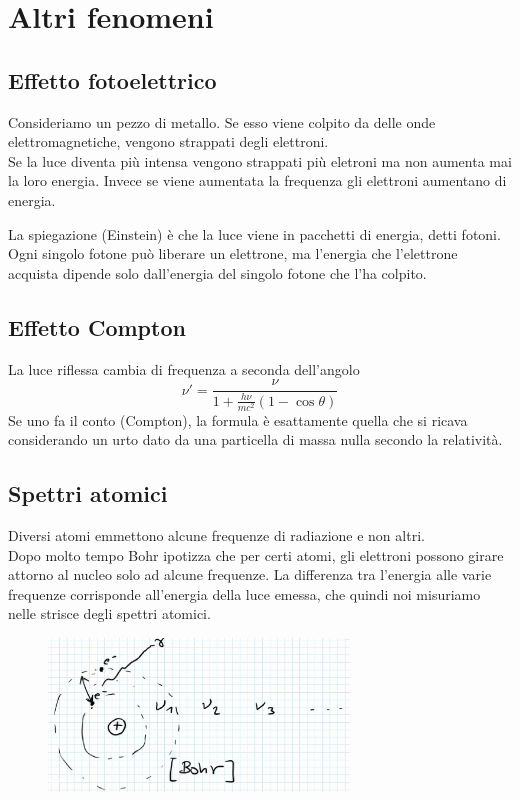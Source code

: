 \section{Altri fenomeni}
\subsection{Effetto fotoelettrico}
Consideriamo un pezzo di metallo. Se esso viene colpito da delle onde elettromagnetiche, vengono strappati degli elettroni.\\
Se la luce diventa pi\`u intensa vengono strappati pi\`u eletroni ma non aumenta mai la loro energia. Invece se viene aumentata la frequenza gli elettroni aumentano di energia.\bigskip

\noindent
La spiegazione (Einstein) \`e che la luce viene in pacchetti di energia, detti fotoni. Ogni singolo fotone pu\`o liberare un elettrone, ma l'energia che l'elettrone acquista dipende solo dall'energia del singolo fotone che l'ha colpito.

\subsection{Effetto Compton}
La luce riflessa cambia di frequenza a seconda dell'angolo
\[\nu'=\frac{\nu}{1+\frac{h\nu}{mc^2}(1-\cos\theta)}\]
Se uno fa il conto (Compton), la formula \`e esattamente quella che si ricava considerando un urto dato da una particella di massa nulla secondo la relativit\`a.

\subsection{Spettri atomici}
Diversi atomi emmettono alcune frequenze di radiazione e non altri.\\
Dopo molto tempo Bohr ipotizza che per certi atomi, gli elettroni possono girare attorno al nucleo solo ad alcune frequenze. La differenza tra l'energia alle varie frequenze corrisponde all'energia della luce emessa, che quindi noi misuriamo nelle strisce degli spettri atomici.

\begin{figure}[!htb]
    \centering
    \includegraphics[width=8cm]{images/diverse_frequenze.png}
\end{figure}



